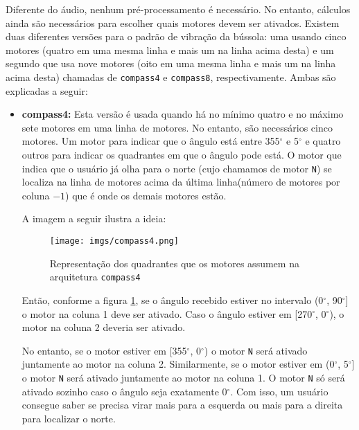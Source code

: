 \documentclass{sig-alternate-05-2015}
\begin{document}
            Diferente do áudio, nenhum pré-processamento é necessário. No
            entanto, cálculos ainda são necessários para escolher quais motores
            devem ser ativados. Existem duas diferentes versões para o padrão
            de vibração da bússola: uma usando cinco motores (quatro em uma
            mesma linha e mais um na linha acima desta) e um segundo que usa
            nove motores (oito em uma mesma linha e mais um na linha acima
            desta) chamadas de \texttt{compass4} e \texttt{compass8},
            respectivamente. Ambas são explicadas a seguir:
            
            \begin{itemize}
                \item \textbf{compass4:} Esta versão é usada quando há no
                    mínimo quatro e no máximo sete motores em uma linha de
                    motores. No entanto, são necessários cinco motores. Um
                    motor para indicar que o ângulo está entre 355$^\circ$ e
                    5$^\circ$ e quatro outros para indicar os quadrantes em que
                    o ângulo pode está. O motor que indica que o usuário já
                    olha para o norte (cujo chamamos de motor \texttt{N}) se
                    localiza na linha de motores acima da última linha(número
                    de motores por coluna $- 1$) que é onde os demais motores
                    estão.
                
                A imagem a seguir ilustra a ideia:
                \begin{figure}[h!]
                    \centering
                    \texttt{[image: imgs/compass4.png]}
                    \caption{Representação dos quadrantes que os motores
                    assumem na arquitetura \texttt{compass4}}
                    \label{fig1}
                \end{figure}
                
                
                Então, conforme a figura \ref{fig1}, se o ângulo recebido
                    estiver no intervalo (0$^\circ$, 90$^\circ$] o motor na
                    coluna 1 deve ser ativado. Caso o ângulo estiver em
                    [270$^\circ$, 0$^\circ$), o motor na coluna 2 deveria ser
                    ativado.
                
                No entanto, se o motor estiver em [355$^\circ$, 0$^\circ$) o
                    motor \texttt{N} será ativado juntamente ao motor na coluna
                    2. Similarmente, se o motor estiver em (0$^\circ$,
                    5$^\circ$] o motor \texttt{N} será ativado juntamente ao
                    motor na coluna 1. O motor \texttt{N} só será ativado
                    sozinho caso o ângulo seja exatamente 0$^\circ$. Com isso,
                    um usuário consegue saber se precisa virar mais para a
                    esquerda ou mais para a direita para localizar o norte.


\end{itemize}
\end{document}
